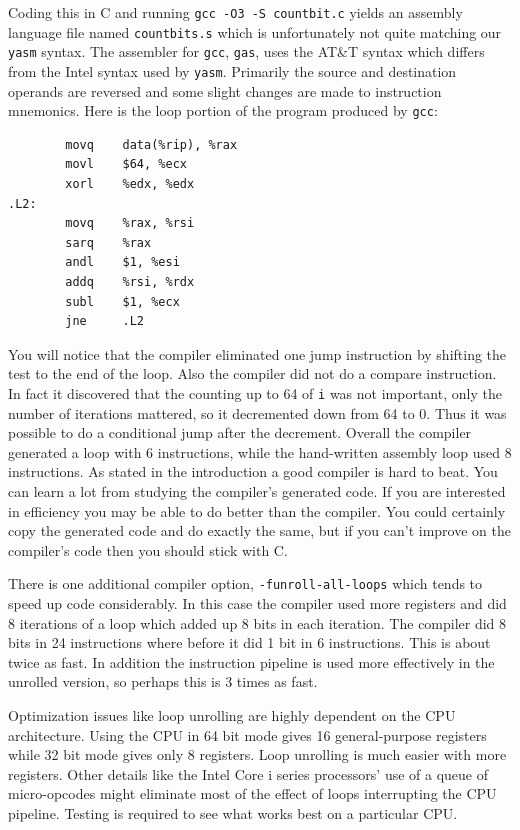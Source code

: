 \documentclass[11pt,b5paper]{book}
\begin{document}
Coding this in C and running {\tt gcc -O3 -S countbit.c} yields an assembly language file named
{\tt countbits.s} which is unfortunately not quite matching our {\tt yasm} syntax.
The assembler for {\tt gcc}, {\tt gas}, uses the AT\&T syntax which differs from the Intel
syntax used by {\tt yasm}.
Primarily the source and destination operands are reversed and some slight changes are made to
instruction mnemonics.
Here is the loop portion of the program produced by {\tt gcc}:
\begin{verbatim}
        movq    data(%rip), %rax
        movl    $64, %ecx
        xorl    %edx, %edx
.L2:
        movq    %rax, %rsi
        sarq    %rax
        andl    $1, %esi
        addq    %rsi, %rdx
        subl    $1, %ecx
        jne     .L2
\end{verbatim}

You will notice that the compiler eliminated one jump instruction by shifting the test to the end of the loop.
Also the compiler did not do a compare instruction.
In fact it discovered that the counting up to 64 of {\tt i} was not important, only the number of iterations
mattered, so it decremented down from 64 to 0.
Thus it was possible to do a conditional jump after the decrement.
Overall the compiler generated a loop with 6 instructions, while the hand-written assembly loop used 8 instructions.
As stated in the introduction a good compiler is hard to beat.
You can learn a lot from studying the compiler's generated code.
If you are interested in efficiency you may be able to do better than the compiler.
You could certainly copy the generated code and do exactly the same, but if you can't improve on the compiler's code
then you should stick with C.

There is one additional compiler option, {\tt -funroll-all-loops} which tends to speed up code considerably.
In this case the compiler used more registers and did 8 iterations of a loop which added up 8 bits in each iteration.
The compiler did 8 bits in 24 instructions where before it did 1 bit in 6 instructions.
This is about twice as fast.
In addition the instruction pipeline is used more effectively in the unrolled version, so perhaps this is 3 times as fast.

Optimization issues like loop unrolling are highly dependent on the CPU architecture.
Using the CPU in 64 bit mode gives 16 general-purpose registers while 32 bit mode gives only 8 registers.
Loop unrolling is much easier with more registers.
Other details like the Intel Core i series processors' use of a queue of micro-opcodes might eliminate most of the effect of loops
interrupting the CPU pipeline.
Testing is required to see what works best on a particular CPU.
\end{document}
